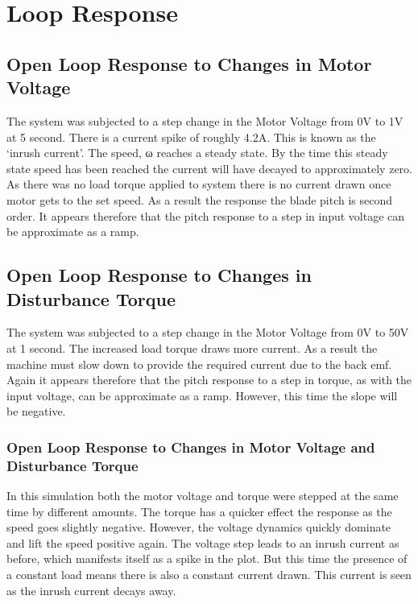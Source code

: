 \newpage
\chapter{Loop Response}
\section{Open Loop Response to Changes in Motor Voltage}
The system was subjected to a step change in the Motor Voltage from 0V to 1V at 5 second. There is a current spike of roughly 4.2A. This is known as the ‘inrush current’. The speed, ω reaches a steady state. By the time this steady state speed has been reached the current will have decayed to approximately zero. As there was no load torque applied to system there is no current drawn once motor gets to the set speed. As a result the response the blade pitch is second order. It appears therefore that the pitch response to a step in input voltage can be approximate as a ramp.


\section{Open Loop Response to Changes in Disturbance Torque}
The system was subjected to a step change in the Motor Voltage from 0V to 50V at 1 second. The increased load torque draws more current. As a result the machine must slow down to provide the required current due to the back emf. Again it appears therefore that the pitch response to a step in torque, as with the input voltage, can be approximate as a ramp. However, this time the slope will be negative.

\subsection{Open Loop Response to Changes in Motor Voltage and Disturbance Torque}
In this simulation both the motor voltage and torque were stepped at the same time by different amounts. The torque has a quicker effect the response as the speed goes slightly negative. However, the voltage dynamics quickly dominate and lift the speed positive again. The voltage step leads to an inrush current as before, which manifests itself as a spike in the plot. But this time the presence of a constant load means there is also a constant current drawn. This current is seen as the inrush current decays away.